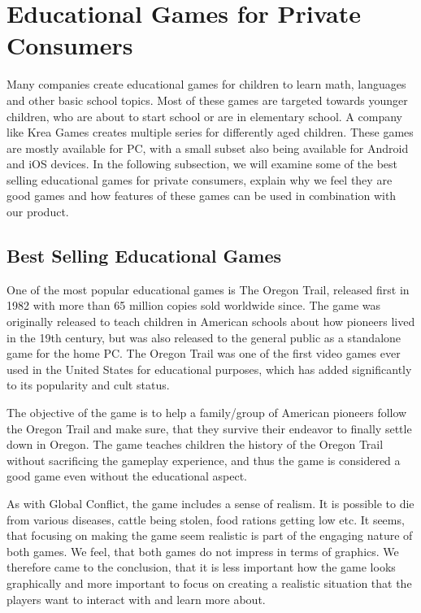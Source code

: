 \section{Educational Games for Private Consumers}
\label{sec:privateconsumers}
Many companies create educational games for children to learn math, languages and other basic school topics.
Most of these games are targeted towards younger children, who are about to start school or are in elementary school.
A company like Krea Games \cite{kreagames} creates multiple series for differently aged children.
These games are mostly available for PC, with a small subset also being available for Android and iOS devices.
In the following subsection, we will examine some of the best selling educational games for private consumers, explain why we feel they are good games and how features of these games can be used in combination with our product.

\subsection{Best Selling Educational Games}
One of the most popular educational games is The Oregon Trail, released first in 1982 with more than 65 million copies sold worldwide since.\cite{oregontrail} The game was originally released to teach children in American schools about how pioneers lived in the 19th century, but was also released to the general public as a standalone game for the home PC. The Oregon Trail was one of the first video games ever used in the United States for educational purposes, which has added  significantly to its popularity and cult status.

The objective of the game is to help a family/group of American pioneers follow the Oregon Trail and make sure, that they survive their endeavor to finally settle down in Oregon. The game teaches children the history of the Oregon Trail without sacrificing the gameplay experience, and thus the game is considered a good game even without the educational aspect.\newline

As with Global Conflict, the game includes a sense of realism. It is possible to die from various diseases, cattle being stolen, food rations getting low etc. It seems, that focusing on making the game seem realistic is part of the engaging nature of both games. We feel, that both games do not impress in terms of graphics. We therefore came to the conclusion, that it is less important how the game looks graphically and more important to focus on creating a realistic situation that the players want to interact with and learn more about.\newline

